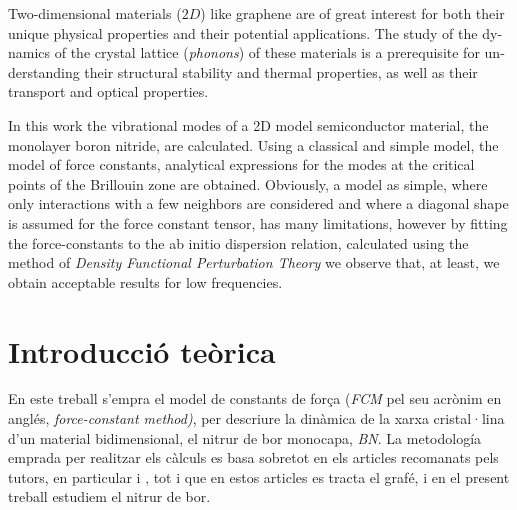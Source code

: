 \documentclass[12pt]{article} %
\begin{document}
\vspace{\baselineskip}

\begin{otherlanguage}{english}\itshape

Two-dimensional materials ($2D$) like graphene are of great interest for both their unique physical properties and their potential applications. The study of the dynamics of the crystal lattice (\textit {phonons}) of these materials is a prerequisite for understanding their structural stability and thermal properties, as well as their transport and optical properties.
 
 In this work the vibrational modes of a 2D model semiconductor material, the monolayer boron nitride, are calculated. Using a classical and simple model, the model of force constants, analytical expressions for the modes at the critical points of the Brillouin zone are obtained. Obviously, a model as simple, where only interactions with a few neighbors are considered and where a diagonal shape is assumed for the force constant tensor, has many limitations, however by fitting the force-constants to the ab initio  dispersion relation, calculated using the method of \emph{Density Functional Perturbation Theory} we observe that, at least, we obtain acceptable results for low frequencies.

\noindent 

\end{otherlanguage}



\section{Introducció teòrica}

En este treball s'empra el model de constants de força (\emph{FCM} pel seu acrònim en anglés, \emph{\foreignlanguage{english}{force-constant method})}, per descriure la dinàmica de la xarxa cristal·lina d'un material bidimensional, el nitrur de bor monocapa, \emph{BN}. La metodología emprada per realitzar els càlculs es basa sobretot en els articles recomanats pels tutors, en particular \cite{wirtz04_phonon_disper_graph_revis} i \cite{falkovsky08_symmet_const_phonon_disper_graph}, tot i que en estos articles es tracta el grafé, i en el present treball estudiem el nitrur de bor.
\end{document}
